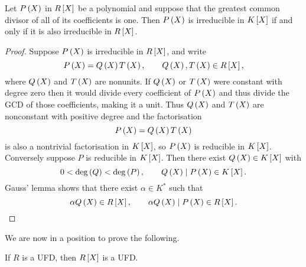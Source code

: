 \begin{proposition}
Let $ P\rb{X} $ in $ R\sb{X} $ be a polynomial and suppose that the greatest common divisor of all of its coefficients is one. Then $ P\rb{X} $ is irreducible in $ K\sb{X} $ if and only if it is also irreducible in $ R\sb{X} $.
\end{proposition}

\begin{proof}
Suppose $ P\rb{X} $ is irreducible in $ R\sb{X} $, and write
$$ P\rb{X} = Q\rb{X}T\rb{X}, \qquad Q\rb{X}, T\rb{X} \in R\sb{X}, $$
where $ Q\rb{X} $ and $ T\rb{X} $ are nonunits. If $ Q\rb{X} $ or $ T\rb{X} $ were constant with degree zero then it would divide every coefficient of $ P\rb{X} $ and thus divide the GCD of those coefficients, making it a unit. Thus $ Q\rb{X} $ and $ T\rb{X} $ are nonconstant with positive degree and the factorisation
$$ P\rb{X} = Q\rb{X}T\rb{X} $$
is also a nontrivial factorisation in $ K\sb{X} $, so $ P\rb{X} $ is reducible in $ K\sb{X} $. Conversely suppose $ P $ is reducible in $ K\sb{X} $. Then there exist $ Q\rb{X} \in K\sb{X} $ with
$$ 0 < \deg\rb{Q} < \deg\rb{P}, \qquad Q\rb{X} \mid P\rb{X} \in K\sb{X}. $$
Gauss' lemma shows that there exist $ \alpha \in K^* $ such that
$$ \alpha Q\rb{X} \in R\sb{X}, \qquad \alpha Q\rb{X} \mid P\rb{X} \in R\sb{X}. $$
\end{proof}

We are now in a position to prove the following.

\begin{theorem}
If $ R $ is a UFD, then $ R\sb{X} $ is a UFD.
\end{theorem}

